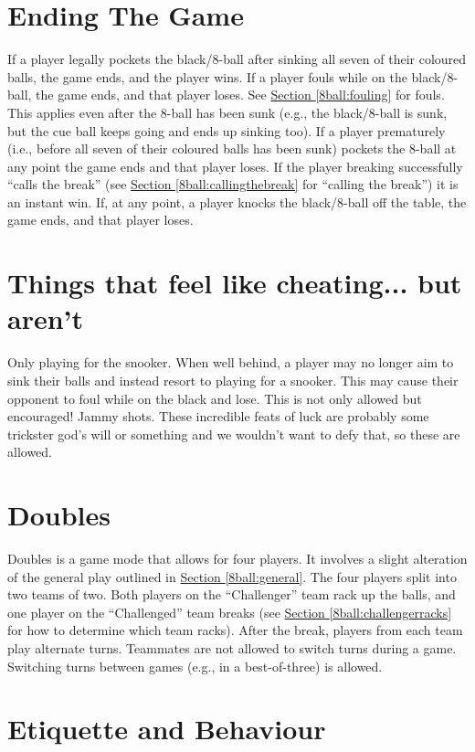 \section{Ending The Game} \label{8ball:ending}
 If a player legally pockets the black/8-ball after sinking all seven of their coloured balls, the game ends, and the player wins.%
 If a player fouls while on the black/8-ball, the game ends, and that player loses. See \hyperref[8ball:fouling]{Section \ref*{8ball:fouling}} for fouls. This applies even after the 8-ball has been sunk (e.g., the black/8-ball is sunk, but the cue ball keeps going and ends up sinking too).%
 If a player prematurely (i.e., before all seven of their coloured balls has been sunk) pockets the 8-ball at any point the game ends and that player loses.%
 If the player breaking successfully “calls the break” (see \hyperref[8ball:callingthebreak]{Section \ref*{8ball:callingthebreak}} for “calling the break”) it is an instant win.%
 If, at any point, a player knocks the black/8-ball off the table, the game ends, and that player loses.%
 \IntentionalFoulLoss[8ball]%
 \MisleadingOpponentLoss[8ball]%
 \PoorBehaviorLoss[8ball]%

\section{Things that feel like cheating... but aren't} \label{8ball:notcheating}
 Only playing for the snooker. When well behind, a player may no longer aim to sink their balls and instead resort to playing for a snooker. This may cause their opponent to foul while on the black and lose. This is not only allowed but encouraged!%
 Jammy shots. These incredible feats of luck are probably some trickster god's will or something and we wouldn't want to defy that, so these are allowed.%

\section{Doubles} \label{8ball:doubles}
 Doubles is a game mode that allows for four players. It involves a slight alteration of the general play outlined in \hyperref[8ball:general]{Section \ref*{8ball:general}}.%
 The four players split into two teams of two.%
 Both players on the “Challenger” team rack up the balls, and one player on the “Challenged” team breaks (see \hyperref[8ball:challengerracks]{Section \ref*{8ball:challengerracks}} for how to determine which team racks).%
 After the break, players from each team play alternate turns.%
 Teammates are not allowed to switch turns during a game. Switching turns between games (e.g., in a best-of-three) is allowed.%

\section{Etiquette and Behaviour} \label{8ball:etiquette}
\label{8ball:misleading}\Misleading%
 \DistractingWhileSettingUp%
 \DistractingWhileStriking%
\label{8ball:sportsmanship}\Sportsmanship%
